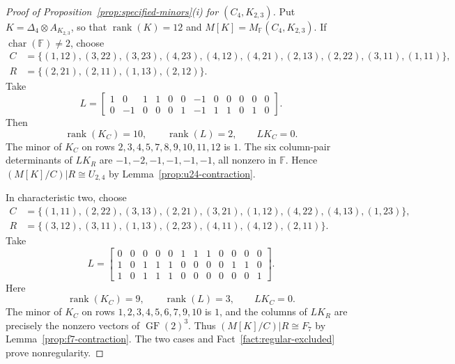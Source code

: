 \documentclass[12pt,a4paper]{article}
\numberwithin{equation}{section}
\DeclareMathOperator{\rank}{rank}
\newcommand{\F}{\mathbb F}
\theoremstyle{definition}
\theoremstyle{remark}
\begin{document}
\begin{proof}[Proof of Proposition~\ref{prop:specified-minors}\textup{(i)} for \((C_4,K_{2,3})\)]
Put \(K=\Delta_4\otimes A_{K_{2,3}}\), so that
\(\rank(K)=12\) and \(M[K]=M_{\F}(C_4,K_{2,3})\).
If \(\operatorname{char}(\F)\ne2\), choose
\[
\begin{aligned}
 C&=\{(1,12),(3,22),(3,23),(4,23),(4,12),(4,21),(2,13),(2,22),(3,11),(1,11)\},\\
 R&=\{(2,21),(2,11),(1,13),(2,12)\}.
\end{aligned}
\]
Take
\[
 L=\begin{bmatrix}
1&0&1&1&0&0&-1&0&0&0&0&0\\
0&-1&0&0&0&1&-1&1&1&0&1&0
\end{bmatrix}.
\]
Then
\[
 \rank(K_C)=10,\qquad \rank(L)=2,\qquad LK_C=0.
\]
The minor of \(K_C\) on rows \(2,3,4,5,7,8,9,10,11,12\)
is \(1\).  The six column-pair determinants of \(LK_R\) are
\(-1,-2,-1,-1,-1,-1\), all nonzero in \(\F\).  Hence
\((M[K]/C)|R\cong U_{2,4}\) by Lemma~\ref{prop:u24-contraction}.

In characteristic two, choose
\[
\begin{aligned}
 C&=\{(1,11),(2,22),(3,13),(2,21),(3,21),(1,12),(4,22),(4,13),(1,23)\},\\
 R&=\{(3,12),(3,11),(1,13),(2,23),(4,11),(4,12),(2,11)\}.
\end{aligned}
\]
Take
\[
 L=\begin{bmatrix}
0&0&0&0&0&1&1&1&0&0&0&0\\
1&0&1&1&1&0&0&0&0&1&1&0\\
1&0&1&1&1&0&0&0&0&0&0&1
\end{bmatrix}.
\]
Here
\[
 \rank(K_C)=9,\qquad \rank(L)=3,\qquad LK_C=0.
\]
The minor of \(K_C\) on rows \(1,2,3,4,5,6,7,9,10\) is \(1\),
and the columns of \(LK_R\) are precisely the nonzero vectors of
\(\operatorname{GF}(2)^3\).  Thus
\((M[K]/C)|R\cong F_7\) by Lemma~\ref{prop:f7-contraction}.
The two cases and Fact~\ref{fact:regular-excluded} prove nonregularity.
\end{proof}
\end{document}
